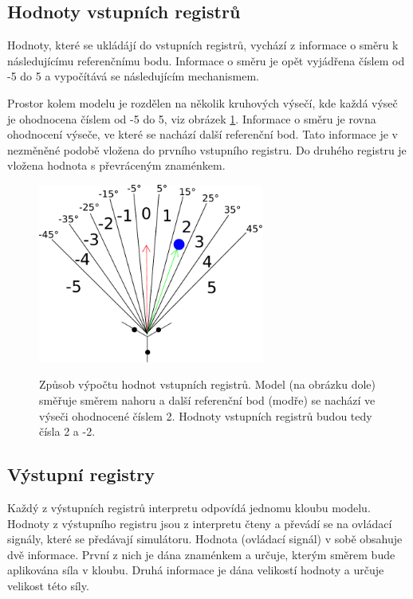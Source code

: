 \subsection{Hodnoty vstupních registrů}

Hodnoty, které se ukládájí do vstupních registrů, vychází z informace o směru k následujícímu referenčnímu bodu.
Informace o směru je opět vyjádřena číslem od -5 do 5 a vypočítává se následujícím mechanismem.

Prostor kolem modelu je rozdělen na několik kruhových výsečí, kde každá výseč je ohodnocena číslem od -5 do 5, viz obrázek \ref{fig:kruhove_vysece}.
Informace o směru je rovna ohodnocení výseče, ve které se nachází další referenční bod.
Tato informace je v nezměněné podobě vložena do prvního vstupního registru.
Do druhého registru je vložena hodnota s převráceným znaménkem.

\begin{figure}[h]
    \centering
    {\includegraphics[width=20em]{obrazky-figures/reference_direction_angles.pdf}}
    \caption{
    Způsob výpočtu hodnot vstupních registrů.
    Model (na obrázku dole) směřuje směrem nahoru a další referenční bod (modře) se nachází ve výseči ohodnocené číslem 2.
    Hodnoty vstupních registrů budou tedy čísla 2 a -2.
    }
    \label{fig:kruhove_vysece}
\end{figure}

\subsection{Výstupní registry}

Každý z výstupních registrů interpretu odpovídá jednomu kloubu modelu.
Hodnoty z výstupního registru jsou z interpretu čteny a převádí se na ovládací signály, které se předávají simulátoru.
Hodnota (ovládací signál) v sobě obsahuje dvě informace.
První z nich je dána znaménkem a určuje, kterým směrem bude aplikována síla v kloubu.
Druhá informace je dána velikostí hodnoty a určuje velikost této síly.







